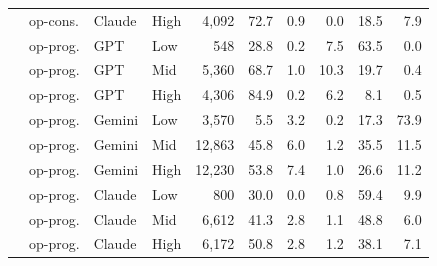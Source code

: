 \begin{table}[t]
\begin{tabular}{llllrrrrrr}
 & op-cons. & Claude & High & 4{,}092 & 72.7 & 0.9 & 0.0 & 18.5 & 7.9 \\
 & op-prog. & GPT & Low & 548 & 28.8 & 0.2 & 7.5 & 63.5 & 0.0 \\
 & op-prog. & GPT & Mid & 5{,}360 & 68.7 & 1.0 & 10.3 & 19.7 & 0.4 \\
 & op-prog. & GPT & High & 4{,}306 & 84.9 & 0.2 & 6.2 & 8.1 & 0.5 \\
 & op-prog. & Gemini & Low & 3{,}570 & 5.5 & 3.2 & 0.2 & 17.3 & 73.9 \\
 & op-prog. & Gemini & Mid & 12{,}863 & 45.8 & 6.0 & 1.2 & 35.5 & 11.5 \\
 & op-prog. & Gemini & High & 12{,}230 & 53.8 & 7.4 & 1.0 & 26.6 & 11.2 \\
 & op-prog. & Claude & Low & 800 & 30.0 & 0.0 & 0.8 & 59.4 & 9.9 \\
 & op-prog. & Claude & Mid & 6{,}612 & 41.3 & 2.8 & 1.1 & 48.8 & 6.0 \\
 & op-prog. & Claude & High & 6{,}172 & 50.8 & 2.8 & 1.2 & 38.1 & 7.1 \\
\bottomrule
\end{tabular}
\end{table}
